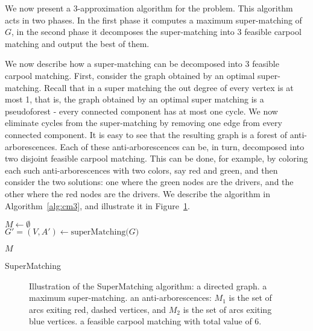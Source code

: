 We now present a 3-approximation algorithm for the \textsc{\CARPOOL{}} problem.
This algorithm acts in two phases.
In the first phase it computes a maximum super-matching of $G$, 
in the second phase it decomposes the super-matching into 3 feasible
carpool matching and output the best of them.

We now describe how a super-matching can be decomposed into 3 feasible carpool
matching.
First, consider the graph obtained by an optimal super-matching.
Recall that in a super matching the out degree of every vertex is at most 1,
that is, the graph obtained by an optimal super matching is a pseudoforest -
every connected component has at most one cycle.
We now eliminate cycles from the super-matching by removing one edge from every
connected component.
It is easy to see that the resulting graph is a forest of anti-arborescences.
Each of these anti-arborescences can be, in turn, decomposed into two disjoint
feasible carpool matching.
This can be done, for example, by coloring each such anti-arborescences with two
colors, say red and green, and then consider the two solutions: one where the
green nodes are the drivers, and the other where the red nodes are the drivers.
We describe the algorithm in Algorithm~\ref{alg:cm3}, 
and illustrate it in Figure~\ref{fig:spanning-bipartite-graph}.   

\begin{algorithm}[t]

$M \leftarrow \emptyset$								\\
$G' = (V, A') \leftarrow \text{superMatching($G$)}$				\\


\Return $M$
\caption{
\label{alg:cm3}
SuperMatching}
\end{algorithm}

\begin{figure}
\centering

\caption[]{
\label{fig:spanning-bipartite-graph}
Illustration of the SuperMatching algorithm:
 a directed graph. 
 a maximum super-matching.  
 an anti-arborescences:
$M_1$ is the set of arcs exiting red, dashed vertices, 
and $M_2$ is the set of arcs exiting blue vertices.
 a feasible carpool matching with total value of 6.   
}
\end{figure}

